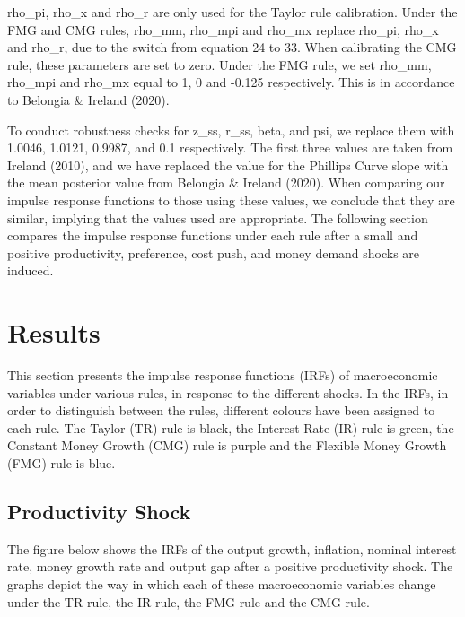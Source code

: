 \documentclass[11pt,preprint, authoryear]{elsarticle}
\numberwithin{equation}{section}
\numberwithin{figure}{section}
\numberwithin{table}{section}
\begin{document}
rho\_pi, rho\_x and rho\_r are only used for the Taylor rule
calibration. Under the FMG and CMG rules, rho\_mm, rho\_mpi and rho\_mx
replace rho\_pi, rho\_x and rho\_r, due to the switch from equation 24
to 33. When calibrating the CMG rule, these parameters are set to zero.
Under the FMG rule, we set rho\_mm, rho\_mpi and rho\_mx equal to 1, 0
and -0.125 respectively. This is in accordance to Belongia \& Ireland
(2020).

To conduct robustness checks for z\_ss, r\_ss, beta, and psi, we replace
them with 1.0046, 1.0121, 0.9987, and 0.1 respectively. The first three
values are taken from Ireland (2010), and we have replaced the value for
the Phillips Curve slope with the mean posterior value from Belongia \&
Ireland (2020). When comparing our impulse response functions to those
using these values, we conclude that they are similar, implying that the
values used are appropriate. The following section compares the impulse
response functions under each rule after a small and positive
productivity, preference, cost push, and money demand shocks are
induced.

\newpage

\hypertarget{results}{%
\section{Results}\label{results}}

This section presents the impulse response functions (IRFs) of
macroeconomic variables under various rules, in response to the
different shocks. In the IRFs, in order to distinguish between the
rules, different colours have been assigned to each rule. The Taylor
(TR) rule is black, the Interest Rate (IR) rule is green, the Constant
Money Growth (CMG) rule is purple and the Flexible Money Growth (FMG)
rule is blue.

\hypertarget{productivity-shock}{%
\subsection{Productivity Shock}\label{productivity-shock}}

The figure below shows the IRFs of the output growth, inflation, nominal
interest rate, money growth rate and output gap after a positive
productivity shock. The graphs depict the way in which each of these
macroeconomic variables change under the TR rule, the IR rule, the FMG
rule and the CMG rule.
\end{document}
